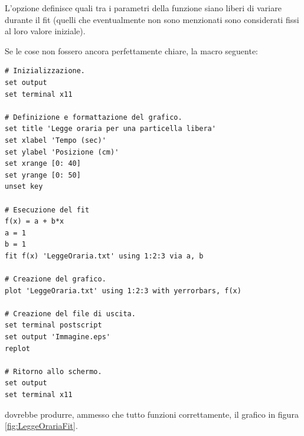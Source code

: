 
\noindent L'opzione  definisce quali tra i parametri della funzione
siano liberi di variare durante il fit (quelli che eventualmente non sono
menzionati sono considerati fissi al loro valore iniziale).

Se le cose non fossero ancora perfettamente chiare, la macro seguente:
\begin{verbatim}
# Inizializzazione.
set output
set terminal x11

# Definizione e formattazione del grafico.
set title 'Legge oraria per una particella libera'
set xlabel 'Tempo (sec)'
set ylabel 'Posizione (cm)'
set xrange [0: 40]
set yrange [0: 50]
unset key

# Esecuzione del fit
f(x) = a + b*x
a = 1
b = 1
fit f(x) 'LeggeOraria.txt' using 1:2:3 via a, b

# Creazione del grafico.
plot 'LeggeOraria.txt' using 1:2:3 with yerrorbars, f(x)

# Creazione del file di uscita.
set terminal postscript
set output 'Immagine.eps'
replot

# Ritorno allo schermo.
set output
set terminal x11
\end{verbatim}
dovrebbe produrre, ammesso che tutto funzioni correttamente, il grafico in
figura
\ref{fig:LeggeOrariaFit}.
\panelfig
